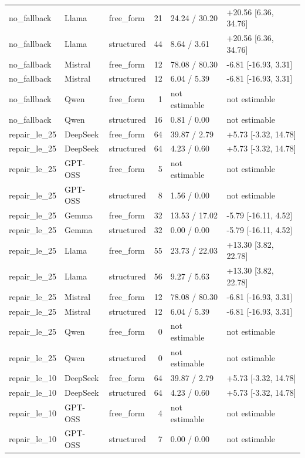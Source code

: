 \begin{longtable}{lllrll}
no\_fallback & Llama & free\_form & 21 & 24.24 / 30.20 & +20.56 [6.36, 34.76] \\
no\_fallback & Llama & structured & 44 & 8.64 / 3.61 & +20.56 [6.36, 34.76] \\
no\_fallback & Mistral & free\_form & 12 & 78.08 / 80.30 & -6.81 [-16.93, 3.31] \\
no\_fallback & Mistral & structured & 12 & 6.04 / 5.39 & -6.81 [-16.93, 3.31] \\
no\_fallback & Qwen & free\_form & 1 & not estimable & not estimable \\
no\_fallback & Qwen & structured & 16 & 0.81 / 0.00 & not estimable \\
repair\_le\_25 & DeepSeek & free\_form & 64 & 39.87 / 2.79 & +5.73 [-3.32, 14.78] \\
repair\_le\_25 & DeepSeek & structured & 64 & 4.23 / 0.60 & +5.73 [-3.32, 14.78] \\
repair\_le\_25 & GPT-OSS & free\_form & 5 & not estimable & not estimable \\
repair\_le\_25 & GPT-OSS & structured & 8 & 1.56 / 0.00 & not estimable \\
repair\_le\_25 & Gemma & free\_form & 32 & 13.53 / 17.02 & -5.79 [-16.11, 4.52] \\
repair\_le\_25 & Gemma & structured & 32 & 0.00 / 0.00 & -5.79 [-16.11, 4.52] \\
repair\_le\_25 & Llama & free\_form & 55 & 23.73 / 22.03 & +13.30 [3.82, 22.78] \\
repair\_le\_25 & Llama & structured & 56 & 9.27 / 5.63 & +13.30 [3.82, 22.78] \\
repair\_le\_25 & Mistral & free\_form & 12 & 78.08 / 80.30 & -6.81 [-16.93, 3.31] \\
repair\_le\_25 & Mistral & structured & 12 & 6.04 / 5.39 & -6.81 [-16.93, 3.31] \\
repair\_le\_25 & Qwen & free\_form & 0 & not estimable & not estimable \\
repair\_le\_25 & Qwen & structured & 0 & not estimable & not estimable \\
repair\_le\_10 & DeepSeek & free\_form & 64 & 39.87 / 2.79 & +5.73 [-3.32, 14.78] \\
repair\_le\_10 & DeepSeek & structured & 64 & 4.23 / 0.60 & +5.73 [-3.32, 14.78] \\
repair\_le\_10 & GPT-OSS & free\_form & 4 & not estimable & not estimable \\
repair\_le\_10 & GPT-OSS & structured & 7 & 0.00 / 0.00 & not estimable \\

\end{longtable}
